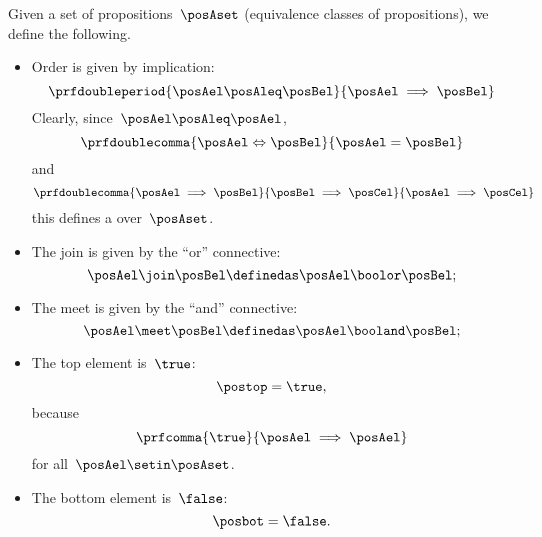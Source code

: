 \begin{ctdefinition}
    \label{def:prop-as-lattice}
    Given a set of propositions~$\posAset$ (equivalence classes of propositions), we define the following.
    \begin{itemize}
        \item Order is given by implication:
              \begin{equation}
                  \prfdoubleperiod{
                      \posAel\posAleq \posBel
                  }{
                      \posAel \implies \posBel
                  }
              \end{equation}
              Clearly, since~$\posAel \posAleq \posAel$,
              \begin{equation}
                  \prfdoublecomma{
                      \posAel \Leftrightarrow \posBel
                  }{
                      \posAel =\posBel
                  }
              \end{equation}
              and
              \begin{equation}
                  \prfdoublecomma{
                      \posAel \implies \posBel
                  }{
                      \posBel \implies \posCel
                  }{
                      \posAel \implies \posCel
                  }
              \end{equation}
              this defines a  over~$\posAset$.
        \item The join is given by the ``or'' connective:
              \begin{equation}
                  \posAel \join \posBel \definedas \posAel \boolor \posBel;
              \end{equation}
        \item The meet is given by the ``and'' connective:
              \begin{equation}
                  \posAel \meet \posBel \definedas \posAel \booland \posBel;
              \end{equation}
        \item The top element is~$\true$:
              \begin{equation}
                  \postop = \true,
              \end{equation}
              because
              \begin{equation}
                  \prfcomma{
                      \true
                  }{
                      \posAel \implies \posAel
                  }
              \end{equation}
              for all~$\posAel\setin \posAset$.
        \item The bottom element is~$\false$:
              \begin{equation}
                  \posbot = \false.
              \end{equation}
    \end{itemize}
\end{ctdefinition}
\begin{marginfigure}
    \centering
    \caption{}
    \label{fig:prod_coprod_prop}
\end{marginfigure}

